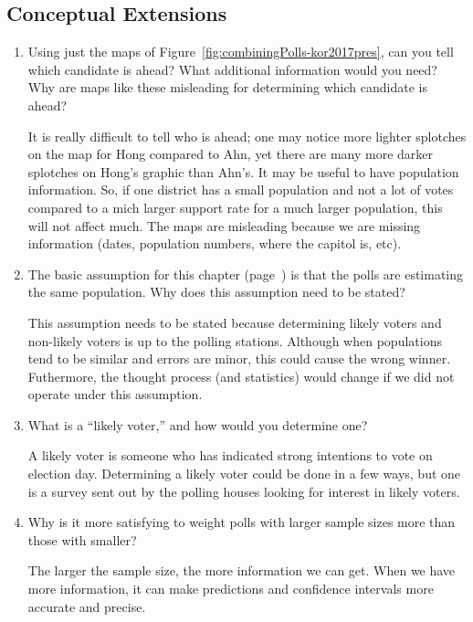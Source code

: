 





\subsection*{Conceptual Extensions}
\begin{enumerate}

 \item Using just the maps of Figure~\ref{fig:combiningPolls-kor2017pres}, can you tell which candidate is ahead? What additional information would you need? Why are maps like these misleading for determining which candidate is ahead?
\begin{solution}
It is really difficult to tell who is ahead; one may notice more lighter splotches on the map for Hong compared to Ahn, yet there are many more darker splotches on Hong's graphic than Ahn's. It may be useful to have population information. So, if one district has a small population and not a lot of votes compared to a mich larger support rate for a much larger population, this will not affect much. The maps are misleading because we are missing information (dates, population numbers, where the capitol is, etc). 
\end{solution}

 \item The basic assumption for this chapter (page~\pageref{combiningPolls-assumptions1}) is that the polls are estimating the same population. Why does this assumption need to be stated?
\begin{solution}
This assumption needs to be stated because determining likely voters and non-likely voters is up to the polling stations. Although when populations tend to be similar and errors are minor, this could cause the wrong winner. Futhermore, the thought process (and statistics) would change if we did not operate under this assumption. 
\end{solution}

 \item What is a ``likely voter,'' and how would you determine one?
\begin{solution}
A likely voter is someone who has indicated strong intentions to vote on election day. Determining a likely voter could be done in a few ways, but one is a survey sent out by the polling houses looking for interest in likely voters. 
\end{solution}

 \item Why is it more satisfying to weight polls with larger sample sizes more than those with smaller?
\begin{solution}
The larger the sample size, the more information we can get. When we have more information, it can make predictions and confidence intervals more accurate and precise. 
\end{solution}


\end{enumerate}
